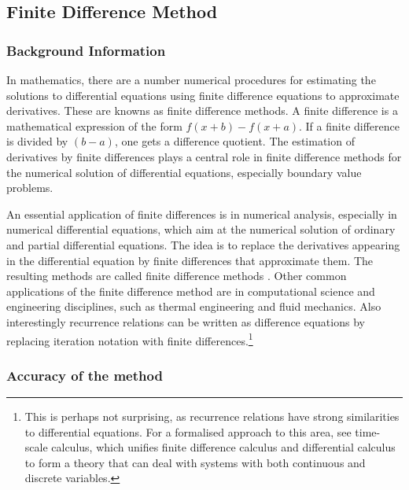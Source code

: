 \documentclass[aps,twocolumn,pre,nofootinbib,10pt]{revtex4-1}
\begin{document}
 
\subsection{Finite Difference Method}

\subsubsection{Background Information}

\par\hspace{4mm} In mathematics, there are a number numerical procedures for estimating the solutions to differential equations using finite difference equations to approximate derivatives. These are knowns as finite difference methods. A finite difference is a mathematical expression of the form \(f(x + b) - f(x + a)\). If a finite difference is divided by \((b - a)\), one gets a difference quotient. The estimation of derivatives by finite differences plays a central role in finite difference methods for the numerical solution of differential equations, especially boundary value problems.
\vspace{5mm} \par \indent An essential application of finite differences is in numerical analysis, especially in numerical differential equations, which aim at the numerical solution of ordinary and partial differential equations. The idea is to replace the derivatives appearing in the differential equation by finite differences that approximate them. The resulting methods are called finite difference methods \cite{compmethods}. Other common applications of the finite difference method are in computational science and engineering disciplines, such as thermal engineering and fluid mechanics. Also interestingly recurrence relations can be written as difference equations by replacing iteration notation with finite differences.\footnote{This is perhaps not surprising, as recurrence relations have strong similarities to differential equations. For a formalised approach to this area, see time-scale calculus, which unifies finite difference calculus and differential calculus to form a theory that can deal with 
systems with both 
continuous and discrete variables.}

\subsubsection{Accuracy of the method}
\end{document}
